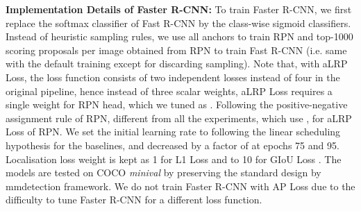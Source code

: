 \documentclass{article}
\begin{document}
\textbf{Implementation Details of Faster R-CNN:} To train Faster R-CNN, we first replace the softmax classifier of  Fast R-CNN by the class-wise sigmoid classifiers. Instead of heuristic sampling rules, we use all anchors to train RPN and top-1000 scoring proposals per image obtained from RPN to train Fast R-CNN (i.e. same with the default training except for discarding sampling). Note that, with aLRP Loss, the loss function consists of two independent losses instead of four in the original pipeline, hence instead of three scalar weights, aLRP Loss requires a single weight for RPN head, which we tuned as . Following the positive-negative assignment rule of RPN, different from all the experiments, which use ,  for aLRP Loss of RPN. We set the initial learning rate to  following the linear scheduling hypothesis \cite{MegDet} for the baselines, and decreased by a factor of  at epochs 75 and 95. Localisation loss weight is kept as 1 for L1 Loss and to 10 for GIoU Loss \cite{mmdetection,GIoULoss}. The models are tested on COCO \textit{minival} by preserving the standard design by mmdetection framework. We do not train Faster R-CNN with AP Loss due to the difficulty to tune Faster R-CNN for a different loss function.



 
%
 
\end{document}
